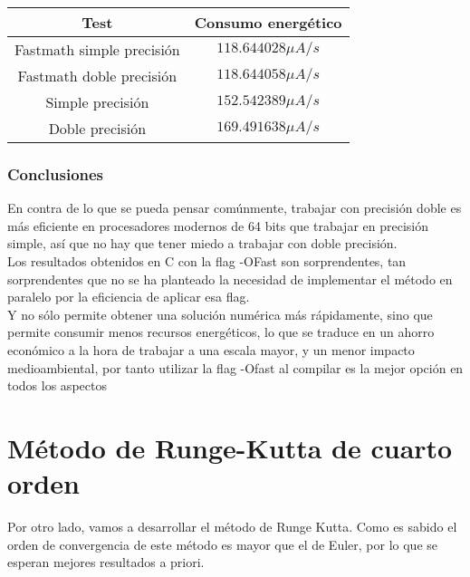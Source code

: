 \begin{ejemplo}
\begin{table}[H]
	\centering
	\begin{tabular}{|c|c|}
		\hline
		\textbf{Test}  & \textbf{Consumo energético}        \\ \hline
		Fastmath simple precisión & $118.644028 \mu A/s$ \\ 
		Fastmath doble precisión  & $118.644058 \mu A/s$ \\
		Simple precisión & $ 152.542389 \mu A/s$ \\
		Doble precisión & $ 169.491638 \mu A/s$ \\
		\hline
	\end{tabular}%
\end{table}
\subsubsection{Conclusiones}
En contra de lo que se pueda pensar comúnmente, trabajar con precisión doble es más eficiente en procesadores modernos de 64 bits que trabajar en precisión simple, así que no hay que tener miedo a trabajar con doble precisión. \\
Los resultados obtenidos en C con la flag -OFast son sorprendentes, tan sorprendentes que no se ha planteado la necesidad  de implementar el método en paralelo por la eficiencia de aplicar esa flag.
\\
Y no sólo permite obtener una solución numérica más rápidamente, sino que permite consumir menos recursos energéticos, lo que se traduce en un ahorro económico a la hora de trabajar a una escala mayor, y un menor impacto medioambiental, por tanto utilizar la flag -Ofast al compilar es la mejor opción en todos los aspectos
\end{ejemplo}

\section{Método de Runge-Kutta de cuarto orden}
Por otro lado, vamos a desarrollar el método de Runge Kutta. Como es sabido el orden de convergencia de este método es mayor que el de Euler, por lo que se esperan mejores resultados a priori.

